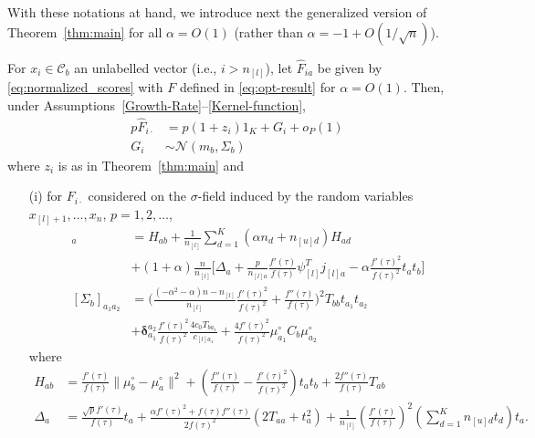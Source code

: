 \documentclass[twoside,11pt]{article}
\begin{document}
With these notations at hand, we introduce next the generalized version of Theorem~\ref{thm:main} for all $\alpha=O(1)$ (rather than $\alpha=-1+O(1/\sqrt{n})$).

\begin{theorem}
	\label{thm:behaviour of output Fu}
	For $x_i\in\mathcal C_b$ an unlabelled vector (i.e., $i>n_{[l]}$), let $\hat F_{ia}$ be given by \eqref{eq:normalized_scores} with $F$ defined in \eqref{eq:opt-result} for $\alpha=O(1)$. Then, under Assumptions~\ref{Growth-Rate}--\ref{Kernel-function},
	\begin{align*}
		p\hat F_{i\cdot} &= p(1+z_i)1_K+ G_i + o_P(1) \\
		G_i& \sim \mathcal N( m_b , \Sigma_b )
	\end{align*}
	where $z_i$ is as in Theorem~\ref{thm:main} and
	\begin{itemize}
		\item[(i)] for $F_{i\cdot}$ considered on the $\sigma$-field induced by the random variables $x_{[l]+1},\ldots,x_n$, $p=1,2,\ldots$,
			\begin{align}
				[m_{b}]_{a} &=H_{ab}+\frac{1}{n_{[l]}}\sum_{d=1}^{K}(\alpha n_{d}+n_{[u]d})H_{ad}\nonumber\\
				&+(1+\alpha)\frac{ n}{n_{[l]}}\Bigg[\Delta_{a}+\frac{p}{n_{[l]a}}\frac{f'(\tau)}{f(\tau)}\psi_{[l]}^Tj_{[l]a}-\alpha\frac{f'(\tau)^2}{f(\tau)^2}t_{a}t_{b}\Bigg]\label{eq:thm Fu eq7}\\
				[\Sigma_{b}]_{a_{1}a_{2}} &=\Bigg(\frac{(-\alpha^{2}-\alpha)n-n_{[l]}}{n_{[l]}}\frac{f'(\tau)^{2}}{f(\tau)^{2}}+\frac{f''(\tau)}{f(\tau)}\Bigg)^{2}T_{bb}t_{a_{1}}t_{a_{2}}\nonumber\\
				&+{\bm\delta}_{a_1}^{a_2}\frac{f'(\tau)^{2}}{f(\tau)^{2}}\frac{4c_0T_{ba_1}}{c_{[l]a_1}}+\frac{4f'(\tau)^{2}}{f(\tau)^{2}}\mu^{\circ}_{a_{1}}C_{b}\mu^{\circ}_{a_{2}}\label{eq:thm Fu eq8}
			\end{align}
			where
			\begin{align}
				H_{ab}&=\frac{f'(\tau)}{f(\tau)}\lVert\mu^{\circ}_{b}-\mu^{\circ}_{a}\rVert^{2}+\left( \frac{f''(\tau)}{f(\tau)} - \frac{f'(\tau)^2}{f(\tau)^2} \right)t_{a}t_{b}+\frac{2f''(\tau)}{f(\tau)}T_{ab}\label{eq:thm Fu eq5}\\
				\Delta_{a}&=\frac{\sqrt{p}f'(\tau)}{f(\tau)}t_{a}+\frac{\alpha f'(\tau)^{2}+f(\tau)f''(\tau)}{2f(\tau)^{2}}\left(2T_{aa}+t_{a}^{2}\right)+\frac{1}{n_{[l]}}\left(\frac{f'(\tau)}{f(\tau)}\right)^{2}\left(\sum_{d=1}^{K}n_{[u]d}t_{d}\right)t_{a}\label{eq:thm Fu eq6}.
			\end{align} 


\end{itemize}
\end{theorem}
\end{document}
